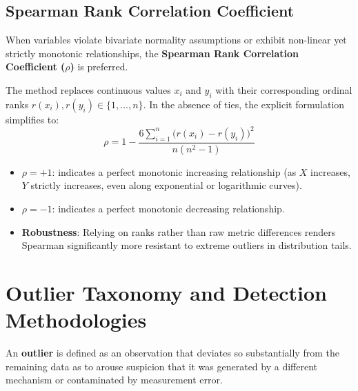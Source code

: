 \subsection{Spearman Rank Correlation Coefficient}

When variables violate bivariate normality assumptions or exhibit non-linear yet strictly monotonic relationships, the \textbf{Spearman Rank Correlation Coefficient ($\rho$)} is preferred.

The method replaces continuous values $x_i$ and $y_i$ with their corresponding ordinal ranks $r(x_i), r(y_i) \in \{1, \dots, n\}$. In the absence of ties, the explicit formulation simplifies to:
\begin{equation}
    \rho = 1 - \frac{6 \sum_{i=1}^n \big(r(x_i) - r(y_i)\big)^2}{n(n^2 - 1)}
\end{equation}

\begin{itemize}[noitemsep]
    \item $\rho = +1$: indicates a perfect monotonic increasing relationship (as $X$ increases, $Y$ strictly increases, even along exponential or logarithmic curves).
    \item $\rho = -1$: indicates a perfect monotonic decreasing relationship.
    \item \textbf{Robustness}: Relying on ranks rather than raw metric differences renders Spearman significantly more resistant to extreme outliers in distribution tails.
\end{itemize}

\section{Outlier Taxonomy and Detection Methodologies}
\label{sec:dm-outlier-detection-taxonomy}

An \textbf{outlier} is defined as an observation that deviates so substantially from the remaining data as to arouse suspicion that it was generated by a different mechanism or contaminated by measurement error.

